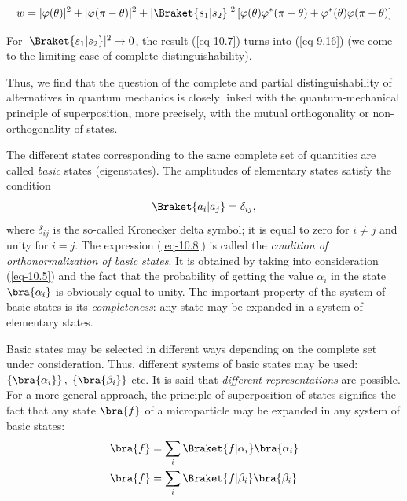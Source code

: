 \documentclass[a4paper,sfsidenotes,colorlinks=true]{tufte-book}
\numberwithin{equation}{section}
\numberwithin{figure}{section}
\begin{document}
\begin{equation}
\begin{split}
w = |\varphi(\theta)|^{2} + |\varphi(\pi - \theta)|^{2} +
|\Braket{s_{1}|s_{2}}|^{2} \left[ \varphi(\theta) \varphi^{*}(\pi -
  \theta) 
 + \varphi^{*}(\theta) \varphi(\pi - \theta) \right]
\end{split}
\label{eq-10.7}
\end{equation}

For $| \Braket{s_{1}|s_{2}}|^{2} \to 0$, the result (\ref{eq-10.7})
  turns into (\ref{eq-9.16}) (we come to the limiting case of complete
  distinguishability).

  Thus, we find that the question of the complete and partial
  distinguishability of alternatives in quantum mechanics is closely
  linked with the quantum-mechanical principle of superposition,
  more precisely, with the mutual orthogonality or non-orthogonality
  of states.

  The  different states corresponding to the
  same complete set of quantities are called \emph{basic} states
  (eigenstates). The amplitudes of elementary states satisfy the
  condition
  \begin{equation}
\Braket{a_{i}|a_{j}} = \delta_{ij},
\label{eq-10.8}
\end{equation}  
where $\delta_{ij}$ is the so-called Kronecker delta symbol; it is
equal to zero for $i \ne j$ and unity for $i = j$. The expression
(\ref{eq-10.8}) is called the \emph{condition of orthonormalization of
  basic states}. It is obtained by taking into consideration
(\ref{eq-10.5}) and the fact that the probability of getting the value
$\alpha_{i}$ in the state $\bra{\alpha_{i}}$ is obviously equal to
unity. The important property of the system of basic states is its
\emph{completeness}: any state may be expanded in a system of
elementary states.

Basic states may be selected in different ways depending on the
complete set under consideration. Thus, different systems of basic
states may be used: $ \left\{ \bra{\alpha_{i}} \right\}, \; \left\{ \bra{\beta_{i}} \right\} $ etc. It is said that \emph{different
  representations} are possible. For a more general approach, the
principle of superposition of states signifies the fact that any
state $\bra{f}$ of a microparticle may he expanded in any system of basic
states: 
\begin{equation}
\begin{split}
\bra{f} & = \sum_{i} \Braket{f|\alpha_{i}} \bra{\alpha_{i}} \\
\bra{f} & = \sum_{i} \Braket{f|\beta_{i}} \bra{\beta_{i}} 
\end{split}
\label{eq-10.9}
\end{equation}
\end{document}
